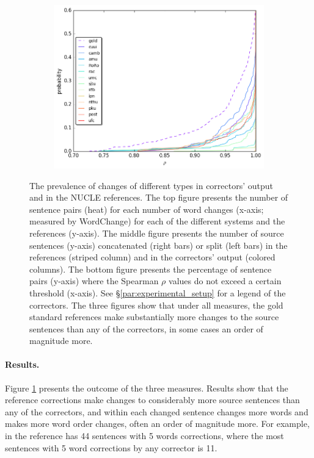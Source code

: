 \documentclass[letter,11pt]{article}
\begin{document}
\begin{figure}
\begin{subfigure}[]{0.4\textwidth}
    \includegraphics[width = \textwidth]{spearman_ecdf}
  \end{subfigure}
  \caption{\label{fig:over-conservatism}
    The prevalence of changes of different types in correctors' output and in the NUCLE references.
    The top figure presents the number of sentence pairs (heat) for each number of word changes
    (x-axis; measured by {\sc WordChange}) for each of the different systems and the references (y-axis).
    The middle figure presents the number of source sentences (y-axis) concatenated (right bars) or split (left bars) in the references (striped column) and in the correctors' output (colored columns).
    The bottom figure presents the percentage of sentence pairs (y-axis) where the
    Spearman $\rho$ values do not exceed a certain threshold (x-axis).
    See \S \ref{par:experimental_setup} for a legend of the correctors.
    The three figures show that under all measures, the gold standard references make
    substantially more changes to the source sentences than any of the correctors,
    in some cases an order of magnitude more.
  }
\end{figure}
\paragraph{Results.}
Figure \ref{fig:over-conservatism} presents the outcome of the three measures. 
Results show that the reference corrections make changes to considerably more source sentences than any of the correctors, and within each changed sentence changes more words and makes more word order changes, often an order of magnitude more. For example, in the reference has 44 sentences with 5 words corrections, where the most sentences with 5 word corrections by any corrector is 11.
\end{document}
